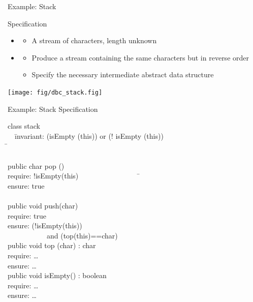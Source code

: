 \begin{frame}{Example: Stack}
  \begin{block}{Specification}
    \begin{itemize}
    \item {}
      \begin{itemize}
      \item A stream of characters, length unknown
      \end{itemize}
    \item {}
      \begin{itemize}
      \item Produce a stream containing the same characters but in reverse
        order
      \item Specify the necessary intermediate abstract data structure
      \end{itemize}
    \end{itemize}
  \end{block}
  \bigskip
  \centerline{\texttt{[image: fig/dbc\_stack.fig]}}
\end{frame}
\begin{frame}{Example: Stack Specification}
  \begin{tabbing}
    class stack\\
    ~~\=invariant: (isEmpty (this)) or (! isEmpty (this))\\
    \>\structure{/*} \=\\
    \>\> \\
    \>public char \alert{pop} ()\\
    \>\>require: !isEmpty(this)   ~~~~~~~~~~~~~~~~
                         \=\\
    \>\>ensure: true     \>\\
    \>\>\>\\
    \>public void \alert{push}(char)\\
    \>\>require: true\\
    \>\>ensure: (!isEmpty(this))
       \>\\
    \>\>~~~~~~~~~~~and (top(this)==char)
       \>\\
    \>public void \alert{top} (char) : char\\
    \>\>require: \ldots \>\\
    \>\>ensure: \ldots\\
    \>public void \alert{isEmpty}() : boolean\\
    \>\>require: \ldots\\
    \>\>ensure: \ldots
  \end{tabbing}
\end{frame}
